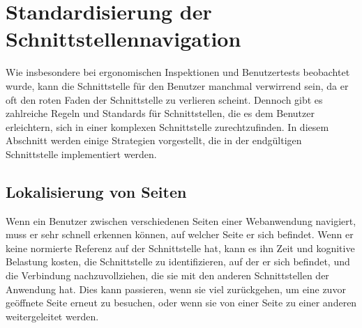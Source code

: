 \section{Standardisierung der Schnittstellennavigation}

Wie insbesondere bei ergonomischen Inspektionen und Benutzertests beobachtet wurde, kann die Schnittstelle für den Benutzer manchmal verwirrend sein, da er oft den roten Faden der Schnittstelle zu verlieren scheint.
Dennoch gibt es zahlreiche Regeln und Standards für Schnittstellen, die es dem Benutzer erleichtern, sich in einer komplexen Schnittstelle zurechtzufinden.
In diesem Abschnitt werden einige Strategien vorgestellt, die in der endgültigen Schnittstelle implementiert werden.

\subsection{Lokalisierung von Seiten}

Wenn ein Benutzer zwischen verschiedenen Seiten einer Webanwendung navigiert, muss er sehr schnell erkennen können, auf welcher Seite er sich befindet.
Wenn er keine normierte Referenz auf der Schnittstelle hat, kann es ihn Zeit und kognitive Belastung kosten, die Schnittstelle zu identifizieren, auf der er sich befindet, und die Verbindung nachzuvollziehen, die sie mit den anderen Schnittstellen der Anwendung hat.
Dies kann passieren, wenn sie viel zurückgehen, um eine zuvor geöffnete Seite erneut zu besuchen, oder wenn sie von einer Seite zu einer anderen weitergeleitet werden.
